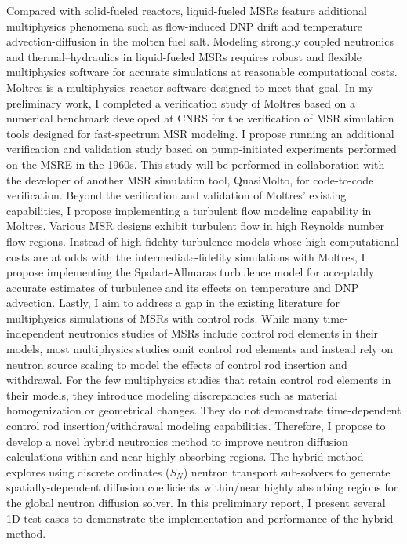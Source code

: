 Compared with solid-fueled reactors, liquid-fueled \glspl{MSR} feature additional multiphysics
phenomena such as flow-induced DNP drift and temperature advection-diffusion in the molten fuel
salt. Modeling strongly coupled neutronics and thermal–hydraulics in
liquid-fueled \glspl{MSR} requires robust and flexible multiphysics software for accurate
simulations at reasonable computational costs. Moltres is a multiphysics reactor software designed
to meet that goal. In my preliminary work, I completed a verification study of Moltres based on a
numerical benchmark developed at \gls{CNRS} for the verification of \gls{MSR} simulation tools
designed for fast-spectrum \gls{MSR} modeling. I propose running an additional verification and
validation study based on pump-initiated experiments performed on the \gls{MSRE} in the 1960s.
This study will be performed in collaboration with the developer of another \gls{MSR} simulation
tool, QuasiMolto, for code-to-code verification. Beyond the verification and validation of Moltres’
existing capabilities, I propose implementing a turbulent flow modeling
capability in Moltres. Various \gls{MSR} designs exhibit turbulent flow in high Reynolds number
flow regions. Instead of high-fidelity turbulence models whose high computational costs are at odds
with the intermediate-fidelity simulations with Moltres, I propose implementing the
Spalart-Allmaras turbulence model for acceptably accurate estimates of turbulence and its effects
on temperature and \gls{DNP} advection.
Lastly, I aim to address a gap in the existing literature for multiphysics simulations of MSRs with
control rods. While many time-independent neutronics studies of MSRs
include control rod elements in their models, most multiphysics studies omit control rod
elements and instead rely on neutron source scaling to model the effects of control rod insertion
and withdrawal. For the few multiphysics studies that retain control
rod elements in their models, they introduce modeling discrepancies such as material homogenization
or geometrical changes. They do not demonstrate time-dependent control rod insertion/withdrawal
modeling capabilities. Therefore, I propose to develop a novel hybrid neutronics method to improve
neutron diffusion calculations within and near highly absorbing regions. The hybrid method explores
using discrete ordinates ($S_N$) neutron transport sub-solvers to generate spatially-dependent
diffusion coefficients within/near highly absorbing regions for the global neutron diffusion
solver. In this preliminary report, I present several 1D test cases to demonstrate the
implementation and performance of the hybrid method.
